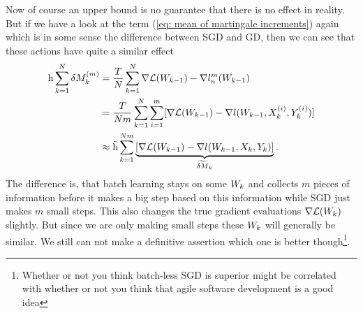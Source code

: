 Now of course an upper bound is no guarantee that there is no effect in reality.
But if we have a look at the term (\ref{eq: mean of martingale increments})
again which is in some sense the difference between SGD and GD, then we can
see that these actions have quite a similar effect
\begin{align*}
	\text{h}\sum_{k=1}^N\delta M_k^{(m)}
	&=\frac{T}{N}\sum_{k=1}^N
	\nabla\mathcal{L}(W_{k-1})- \nabla l_n^m(W_{k-1})\\
	&=\frac{T}{Nm}\sum_{k=1}^N\sum_{i=1}^m
	[\nabla\mathcal{L}(W_{k-1})-\nabla l(W_{k-1},X^{(i)}_k, Y^{(i)}_k)]\\
	&\approx \tilde{\text{h}} \sum_{k=1}^{Nm}
	\underbrace{
		[\nabla\mathcal{L}(W_{k-1})-\nabla l(W_{k-1},X_k, Y_k)]
	}_{\widetilde{\delta M}_k}.
\end{align*}
The difference is, that batch learning stays on some \(W_k\) and collects
\(m\) pieces of information before it makes a big step based on this information
while SGD just makes \(m\) small steps. This also changes the true gradient
evaluations \(\nabla\mathcal{L}(W_k)\) slightly. But since we are only making
small steps these \(W_k\) will generally be similar. We still can not
make a definitive assertion which one is better though\footnote{
	Whether or not you think batch-less SGD is superior might be correlated with
	whether or not you think that agile software development is a good idea
}.

